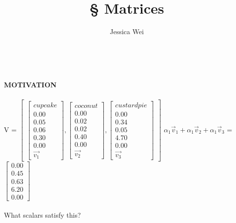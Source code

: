 \documentclass [12pt]{article}
\begin{document}
\begin{center}\title*{\Large \S {} Matrices}\\\author*{Jessica Wei} \end{center}
\normalsize
\noindent\textbf{MOTIVATION}\\
\\
V = 
$\begin{bmatrix}
\begin{bmatrix}
cupcake\\
0.00\\
0.05\\
0.06\\
0.30\\
0.00\\
\overrightarrow{v_1}
\end{bmatrix}
,
\begin{bmatrix}
coconut\\
0.00\\
0.02\\
0.02\\
0.40\\
0.00\\
\overrightarrow{v_2}
\end{bmatrix}
,
\begin{bmatrix}
custard pie\\
0.00\\
0.34\\
0.05\\
4.70\\
0.00\\
\overrightarrow{v_3}
\end{bmatrix}
\end{bmatrix}$
\indent
$\alpha_1\overrightarrow{v}_1+\alpha_1\overrightarrow{v}_2+\alpha_1\overrightarrow{v}_3$ = $\begin{bmatrix}
0.00\\
0.45\\
0.63\\
6.20\\
0.00
\end{bmatrix}$\\\\
What scalars satisfy this?
\end{document}
